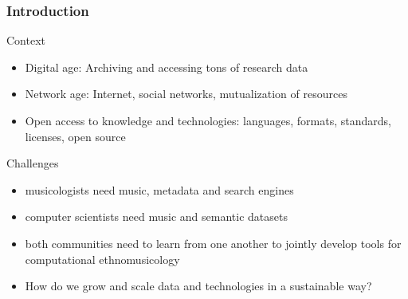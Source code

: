 \documentclass[final, hyperref, table]{beamer}
\begin{document}
\begin{frame}\frametitle{Introduction}
 \begin{block}{Context}
   \begin{itemize}
    \item \alert{Digital age}: Archiving and accessing tons of research data
    \item \alert{Network age}: Internet, social networks, mutualization of resources
    \item \alert{Open access to knowledge and technologies}: languages, formats, standards, licenses, open source
   \end{itemize}
\end{block}

\begin{block}{Challenges}
   \begin{itemize}
    \item \alert{musicologists} need music, metadata and search engines
    \item \alert{computer scientists} need music and semantic datasets
    \item both communities need to learn from one another to jointly develop tools for \alert{computational ethnomusicology}
    \item How do we \alert{grow and scale} data and technologies in a \alert{sustainable way}?
   \end{itemize}
\end{block}




\end{frame}
\end{document}
